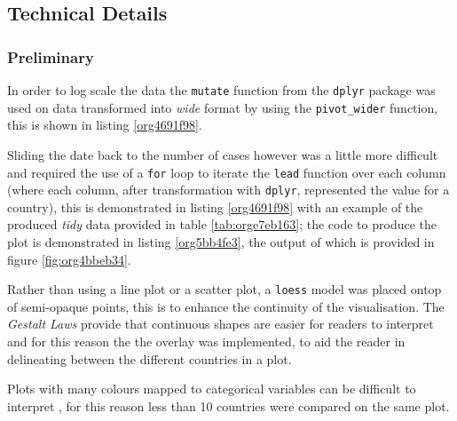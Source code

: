 \documentclass[11pt]{article}
\begin{document}
\subsection{Technical Details}
\label{sec:org422c64f}
\subsubsection{Preliminary}
\label{sec:org7ab654c}
In order to log scale the data the \texttt{mutate} function from the \texttt{dplyr} package
was used on data transformed into \emph{wide} format by using the \texttt{pivot\_wider}
function, this is shown in listing \ref{org4691f98}.

Sliding the date back to the number of cases however was a little more difficult
and required the use of a \texttt{for} loop to iterate the \texttt{lead} function over each
column (where each column, after transformation with \texttt{dplyr}, represented the
value for a country), this is demonstrated in listing \ref{org4691f98} with an example of the
produced \emph{tidy} data provided in table \ref{tab:orge7eb163}; the code to produce the plot is
demonstrated in listing \ref{org5bb4fe3}, the output of which is provided in figure \ref{fig:org4bbeb34}.

Rather than using a line plot or a scatter plot, a \texttt{loess} model was placed ontop of semi-opaque points, this is to enhance the continuity of the visualisation. The \emph{Gestalt Laws} provide that continuous shapes are easier for readers to interpret \cite{staudinger2011} and for this reason the the overlay was implemented, to aid the reader in delineating between the different countries in a plot.

Plots with many colours mapped to categorical variables can be difficult to interpret \cite{wilson2017,rost2018}, for this reason less than 10 countries were compared on the same plot.
\end{document}
